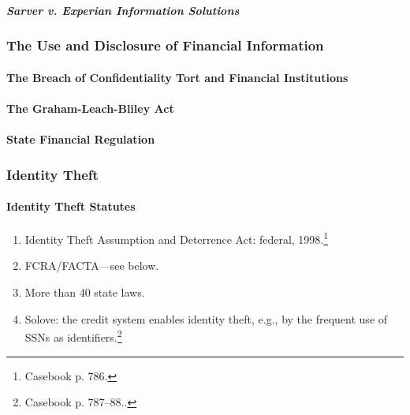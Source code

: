 \paragraph{\emph{Sarver v. Experian Information Solutions}}


\subsubsection{The Use and Disclosure of Financial Information}

\paragraph{The Breach of Confidentiality Tort and Financial Institutions}


\paragraph{The Graham-Leach-Bliley Act}


\paragraph{State Financial Regulation}


\subsubsection{Identity Theft}

\paragraph{Identity Theft Statutes}

\begin{enumerate}
    \item Identity Theft Assumption and Deterrence Act: federal, 
    1998.\footnote{Casebook p. 786.}
    \item FCRA/FACTA---see below.
    \item More than 40 state laws.
    \item Solove: the credit system enables identity theft, e.g., by the 
    frequent use of SSNs as identifiers.\footnote{Casebook p. 787--88..}
\end{enumerate}

